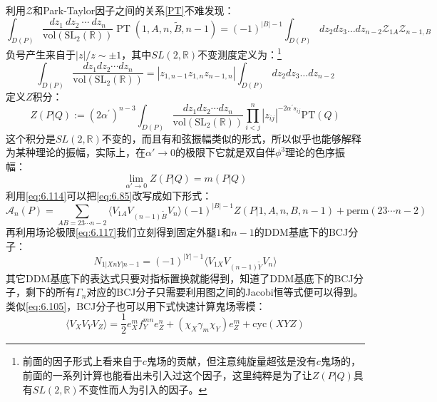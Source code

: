 利用$\mathcal{Z}$和Park-Taylor因子之间的关系\ref{PT}不难发现：
\begin{equation}
	\label{eq:6.114}
	\int_{D(P)}\frac{dz_1\mathrm{~}dz_2\mathrm{~}\cdots\mathrm{~}dz_n}{\mathrm{vol}(\mathrm{SL}_2(\mathbb{R}))}\operatorname{PT}(1,A,n,\tilde{B},n-1)=(-1)^{|B|-1}\int_{D(P)}dz_2dz_3\ldots dz_{n-2}\mathcal{Z}_{1A}\mathcal{Z}_{n-1,B}
\end{equation}
负号产生来自于$|z|/z\sim\pm 1$，其中$SL(2,\mathbb{R})$不变测度定义为：\footnote{前面的因子形式上看来自于$c$鬼场的贡献，但注意纯旋量超弦是没有$c$鬼场的，前面的一系列计算也能看出未引入过这个因子，这里纯粹是为了让$Z(P|Q)$具有$SL(2,\mathbb{R})$不变性而人为引入的因子。}
\begin{equation}
	\int_{D(P)}\frac{dz_1dz_2\cdots dz_n}{\mathrm{vol}(\mathrm{SL}_2(\mathbb{R}))}=|z_{1,n-1}z_{1,n}z_{n-1,n}|\int_{D(P)}dz_2dz_3\ldots dz_{n-2}
\end{equation}
定义$Z$积分：
\begin{equation}
	\label{eq:6.118}
	Z(P|Q):=(2\alpha^{\prime})^{n-3}\int_{D(P)}\frac{dz_1dz_2\cdots dz_n}{\mathrm{vol}(\mathrm{SL}_2(\mathbb{R}))}{\prod_{i<j}^n|z_{ij}|^{-2\alpha^{\prime}s_{ij}}}\mathrm{PT}(Q)
\end{equation}
这个积分是$SL(2,\mathbb{R})$不变的，而且有和弦振幅类似的形式，所以似乎也能够解释为某种理论的振幅，实际上，在$\alpha'\to 0$的极限下它就是双自伴$\phi^3$理论的色序振幅：\cite{Cachazo:2013iea}
\begin{equation}
	\label{eq:6.117}
	\lim_{\alpha'\to 0}Z(P|Q) = m(P|Q)
\end{equation}
利用\ref{eq:6.114}可以把\ref{eq:6.85}改写成如下形式：
\begin{equation}
	\label{eq:118}
\boxed{	\mathcal{A}_n(P)=\sum_{AB=23\cdots n-2}\langle V_{1A}V_{(n-1)\tilde{B}}V_n\rangle(-1)^{|B|-1}Z(P|1,A,n,B,n-1)+\mathrm{perm}(23\cdots n-2)}
\end{equation}
再利用场论极限\ref{eq:6.117}我们立刻得到固定外腿$1$和$n-1$的DDM基底下的BCJ分子：
\begin{equation}
	\label{eq:6.119}
\boxed{
		N_{1|XnY|n-1}=(-1)^{|Y|-1}\langle V_{1X}V_{(n-1)\tilde{Y}}V_n\rangle
}
\end{equation}
其它DDM基底下的表达式只要对指标置换就能得到，知道了DDM基底下的BCJ分子，剩下的所有$\Gamma_n$对应的BCJ分子只需要利用图之间的Jacobi恒等式便可以得到。类似\ref{eq:6.105}，BCJ分子也可以用下式快速计算鬼场零模：
\begin{equation}
	\langle V_XV_YV_Z\rangle=\frac{1}{2}e_X^mf_Y^{mn}e_Z^n+(\chi_X\gamma_m\chi_Y)e_Z^m+\mathrm{cyc}(XYZ)
\end{equation}
